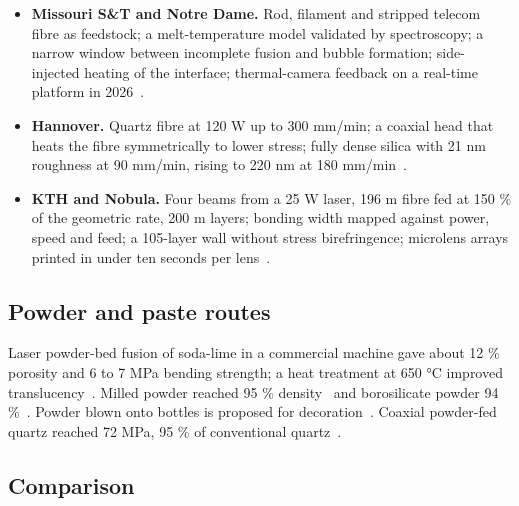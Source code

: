 \documentclass[10pt,a4paper]{article}
\begin{document}
\begin{itemize}
  \item \textbf{Missouri S\&T and Notre Dame.} Rod, filament and stripped telecom fibre as feedstock; a melt-temperature model validated by spectroscopy; a narrow window between incomplete fusion and bubble formation; side-injected heating of the interface; thermal-camera feedback on a real-time platform in 2026~\citep{luo2017sodalime,luo2017heat,hostetler2018fiber,capps2021interface,dgf2026control}.
  \item \textbf{Hannover.} Quartz fibre at 120 W up to 300 mm/min; a coaxial head that heats the fibre symmetrically to lower stress; fully dense silica with 21 nm roughness at 90 mm/min, rising to 220 nm at 180 mm/min~\citep{witzendorff2018,lgd2021coaxial,lgd2024homog}.
  \item \textbf{KTH and Nobula.} Four beams from a 25 W laser, 196 \textmu{}m fibre fed at 150 \% of the geometric rate, 200 \textmu{}m layers; bonding width mapped against power, speed and feed; a 105-layer wall without stress birefringence; microlens arrays printed in under ten seconds per lens~\citep{kth2022bonding,kth2024microlens}.
\end{itemize}

\subsection{Powder and paste routes}

Laser powder-bed fusion of soda-lime in a commercial machine gave about 12 \% porosity and 6 to 7 MPa bending strength; a heat treatment at 650 °C improved translucency~\citep{datsiou2019,datsiou2021}. Milled powder reached 95 \% density~\citep{slmirregular2023} and borosilicate powder 94 \%~\citep{boro2025laser}. Powder blown onto bottles is proposed for decoration~\citep{spirrett2023}. Coaxial powder-fed quartz reached 72 MPa, 95 \% of conventional quartz~\citep{lang2024}.

\subsection{Comparison}
\end{document}
